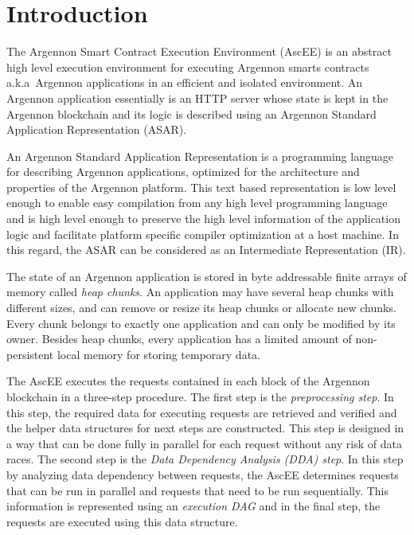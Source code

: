 

\section{Introduction}\label{sec:introduction}

The Argennon Smart Contract Execution Environment (AscEE) is an abstract high level execution environment for executing
Argennon smarts contracts a.k.a\ Argennon applications in an efficient and isolated environment. An Argennon
application essentially is an HTTP server whose state is
kept in the Argennon blockchain and its logic is described using an Argennon Standard Application Representation (ASAR).

An Argennon Standard Application Representation is a programming language for describing Argennon
applications, optimized
for the architecture and properties of the Argennon platform. This text based representation is low level
enough to enable easy compilation from any high level programming language and is high level enough to preserve
the high level information of the application logic and facilitate platform specific compiler optimization at a host
machine. In this regard, the ASAR can be considered as an Intermediate Representation (IR).

The state of an Argennon application is stored in byte addressable finite arrays of memory called
\emph{heap chunks}. An application may have several heap chunks with different sizes, and can remove or
resize its heap chunks or allocate new chunks. Every chunk belongs to exactly one application and can only be modified
by its owner. Besides heap chunks, every application has a limited amount of non-persistent local memory for
storing temporary data.

The AscEE executes the requests contained in each block of the Argennon
blockchain in a three-step procedure. The first step is the \emph{preprocessing step}. In this step, the required
data for executing requests are retrieved and verified and the
helper data structures for next steps are constructed. This step is
designed in a way that can be done fully in parallel for each request without any risk of data races. The second
step is the \emph{Data Dependency Analysis (DDA) step}.
In this step by analyzing data dependency between requests, the AscEE determines requests that can be run in parallel
and requests that need to be run sequentially. This information is represented using an \emph{execution DAG} and in
the final step, the requests are executed using this data structure.


